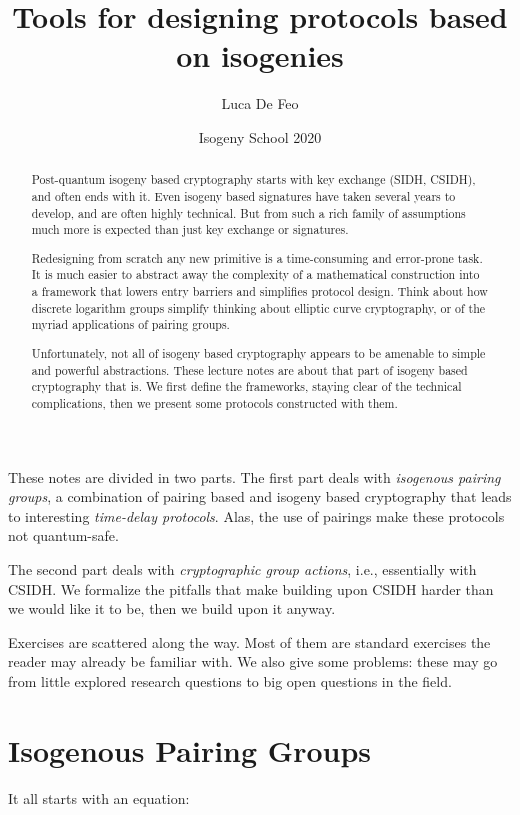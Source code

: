 \documentclass{article}
\title{Tools for designing protocols based on isogenies}
\author{Luca De Feo}
\date{Isogeny School 2020}
\begin{document}
\maketitle

\begin{abstract}
  Post-quantum isogeny based cryptography starts with key exchange
  (SIDH, CSIDH), and often ends with it.  Even isogeny based
  signatures have taken several years to develop, and are often highly
  technical.  But from such a rich family of assumptions much more is
  expected than just key exchange or signatures.

  Redesigning from scratch any new primitive is a time-consuming and
  error-prone task.  It is much easier to abstract away the complexity
  of a mathematical construction into a framework that lowers entry
  barriers and simplifies protocol design.  Think about how discrete
  logarithm groups simplify thinking about elliptic curve
  cryptography, or of the myriad applications of pairing groups.

  Unfortunately, not all of isogeny based cryptography appears to be
  amenable to simple and powerful abstractions. These lecture notes
  are about that part of isogeny based cryptography that is.  We first
  define the frameworks, staying clear of the technical complications,
  then we present some protocols constructed with them.
\end{abstract}

These notes are divided in two parts.  The first part deals with
\emph{isogenous pairing groups}, a combination of pairing based and
isogeny based cryptography that leads to interesting \emph{time-delay
  protocols}.  Alas, the use of pairings make these protocols not
quantum-safe.

The second part deals with \emph{cryptographic group actions}, i.e.,
essentially with CSIDH.  We formalize the pitfalls that make building
upon CSIDH harder than we would like it to be, then we build upon it
anyway.

Exercises are scattered along the way. Most of them are standard
exercises the reader may already be familiar with.  We also give some
problems: these may go from little explored research questions to big
open questions in the field.


\part{Isogenous Pairing Groups}

It all starts with an equation:
\end{document}
